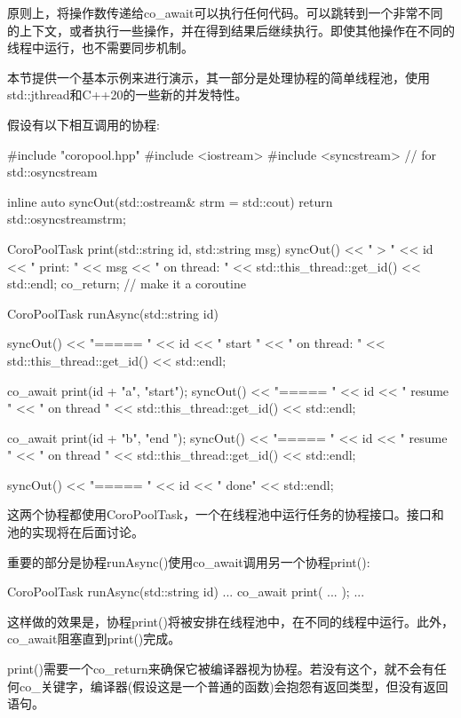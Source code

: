 

原则上，将操作数传递给co\_await可以执行任何代码。可以跳转到一个非常不同的上下文，或者执行一些操作，并在得到结果后继续执行。即使其他操作在不同的线程中运行，也不需要同步机制。

本节提供一个基本示例来进行演示，其一部分是处理协程的简单线程池，使用std::jthread和C++20的一些新的并发特性。


假设有以下相互调用的协程:


\begin{cpp}
#include "coropool.hpp"
#include <iostream>
#include <syncstream> // for std::osyncstream

inline auto syncOut(std::ostream& strm = std::cout) {
	return std::osyncstream{strm};
}

CoroPoolTask print(std::string id, std::string msg)
{
	syncOut() << "       > " << id << " print: " << msg
			  << "       on thread: " << std::this_thread::get_id() << std::endl;
	co_return; // make it a coroutine
}

CoroPoolTask runAsync(std::string id)
{
	syncOut() << "===== " << id << " start "
			  << "   on thread: " << std::this_thread::get_id() << std::endl;

	co_await print(id + "a", "start");
	syncOut() << "===== " << id << " resume "
			  << "   on thread " << std::this_thread::get_id() << std::endl;

	co_await print(id + "b", "end ");
	syncOut() << "===== " << id << " resume "
			  << "   on thread " << std::this_thread::get_id() << std::endl;

	syncOut() << "===== " << id << " done" << std::endl;
}
\end{cpp}

这两个协程都使用CoroPoolTask，一个在线程池中运行任务的协程接口。接口和池的实现将在后面讨论。

重要的部分是协程runAsync()使用co\_await调用另一个协程print():

\begin{cpp}
CoroPoolTask runAsync(std::string id)
{
	...
	co_await print( ... );
	...
}
\end{cpp}

这样做的效果是，协程print()将被安排在线程池中，在不同的线程中运行。此外，co\_await阻塞直到print()完成。

print()需要一个co\_return来确保它被编译器视为协程。若没有这个，就不会有任何co\_关键字，编译器(假设这是一个普通的函数)会抱怨有返回类型，但没有返回语句。

